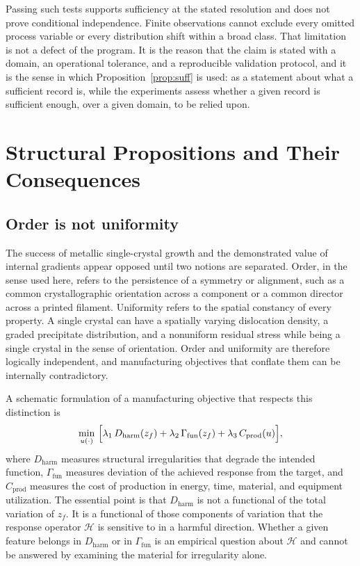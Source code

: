 \documentclass[11pt]{article}
\theoremstyle{definition}
\newcommand{\Hmap}{\mathcal{H}}
\begin{document}
Passing such tests supports sufficiency at the stated resolution and does not prove conditional independence. Finite observations cannot exclude every omitted process variable or every distribution shift within a broad class. That limitation is not a defect of the program. It is the reason that the claim is stated with a domain, an operational tolerance, and a reproducible validation protocol, and it is the sense in which Proposition~\ref{prop:suff} is used: as a statement about what a sufficient record is, while the experiments assess whether a given record is sufficient enough, over a given domain, to be relied upon.

\section{Structural Propositions and Their Consequences}

\subsection{Order is not uniformity}

The success of metallic single-crystal growth and the demonstrated value of internal gradients appear opposed until two notions are separated. Order, in the sense used here, refers to the persistence of a symmetry or alignment, such as a common crystallographic orientation across a component or a common director across a printed filament. Uniformity refers to the spatial constancy of every property. A single crystal can have a spatially varying dislocation density, a graded precipitate distribution, and a nonuniform residual stress while being a single crystal in the sense of orientation. Order and uniformity are therefore logically independent, and manufacturing objectives that conflate them can be internally contradictory.

A schematic formulation of a manufacturing objective that respects this distinction is
\begin{equation}
\min_{u(\cdot)}\ \Bigl[\lambda_1\,D_{\mathrm{harm}}(z_f)+\lambda_2\,\Gamma_{\mathrm{fun}}(z_f)+\lambda_3\,C_{\mathrm{prod}}(u)\Bigr],
\label{eq:objective}
\end{equation}
where $D_{\mathrm{harm}}$ measures structural irregularities that degrade the intended function, $\Gamma_{\mathrm{fun}}$ measures deviation of the achieved response from the target, and $C_{\mathrm{prod}}$ measures the cost of production in energy, time, material, and equipment utilization. The essential point is that $D_{\mathrm{harm}}$ is not a functional of the total variation of $z_f$. It is a functional of those components of variation that the response operator $\Hmap$ is sensitive to in a harmful direction. Whether a given feature belongs in $D_{\mathrm{harm}}$ or in $\Gamma_{\mathrm{fun}}$ is an empirical question about $\Hmap$ and cannot be answered by examining the material for irregularity alone.
\end{document}
